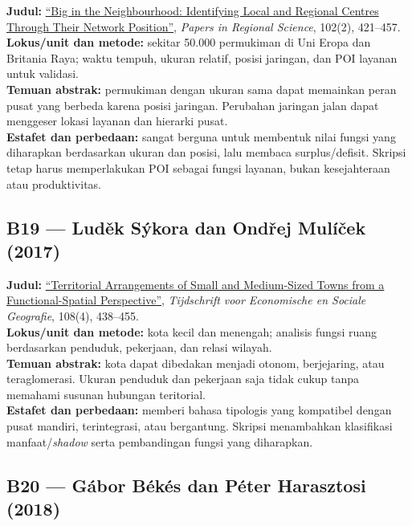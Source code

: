 \documentclass[
  indonesian,
  11pt,
  a4paper,
  oneside,
  openany]{report}
\begin{document}
\textbf{Judul:} \href{https://doi.org/10.1111/pirs.12727}{``Big in the
Neighbourhood: Identifying Local and Regional Centres Through Their
Network Position''}, \emph{Papers in Regional Science}, 102(2),
421--457.\\
\textbf{Lokus/unit dan metode:} sekitar 50.000 permukiman di Uni Eropa
dan Britania Raya; waktu tempuh, ukuran relatif, posisi jaringan, dan
POI layanan untuk validasi.\\
\textbf{Temuan abstrak:} permukiman dengan ukuran sama dapat memainkan
peran pusat yang berbeda karena posisi jaringan. Perubahan jaringan
jalan dapat menggeser lokasi layanan dan hierarki pusat.\\
\textbf{Estafet dan perbedaan:} sangat berguna untuk membentuk nilai
fungsi yang diharapkan berdasarkan ukuran dan posisi, lalu membaca
surplus/defisit. Skripsi tetap harus memperlakukan POI sebagai fungsi
layanan, bukan kesejahteraan atau produktivitas.

\subsection{B19 --- Luděk Sýkora dan Ondřej Mulíček
(2017)}\label{b19-ludux11bk-suxfdkora-dan-ondux159ej-muluxedux10dek-2017}

\textbf{Judul:} \href{https://doi.org/10.1111/tesg.12249}{``Territorial
Arrangements of Small and Medium-Sized Towns from a Functional-Spatial
Perspective''}, \emph{Tijdschrift voor Economische en Sociale
Geografie}, 108(4), 438--455.\\
\textbf{Lokus/unit dan metode:} kota kecil dan menengah; analisis fungsi
ruang berdasarkan penduduk, pekerjaan, dan relasi wilayah.\\
\textbf{Temuan abstrak:} kota dapat dibedakan menjadi otonom,
berjejaring, atau teraglomerasi. Ukuran penduduk dan pekerjaan saja
tidak cukup tanpa memahami susunan hubungan teritorial.\\
\textbf{Estafet dan perbedaan:} memberi bahasa tipologis yang kompatibel
dengan pusat mandiri, terintegrasi, atau bergantung. Skripsi menambahkan
klasifikasi manfaat/\emph{shadow} serta pembandingan fungsi yang
diharapkan.

\subsection{B20 --- Gábor Békés dan Péter Harasztosi
(2018)}\label{b20-guxe1bor-buxe9kuxe9s-dan-puxe9ter-harasztosi-2018}
\end{document}
